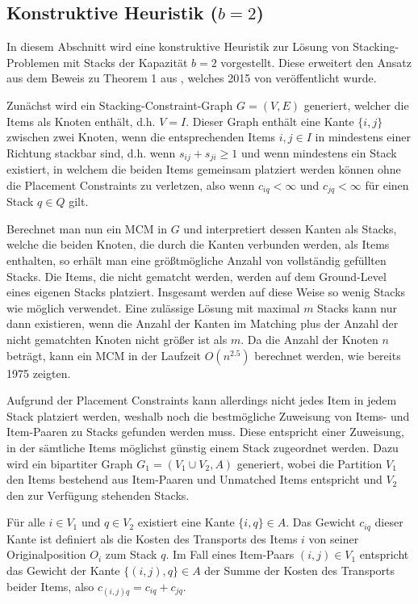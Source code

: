 \subsection{Konstruktive Heuristik ($b = 2$)}
\label{sec:two_cap_heuristic}

In diesem Abschnitt wird eine konstruktive Heuristik zur Lösung von Stacking-Problemen mit Stacks der Kapazität $b=2$
vorgestellt. Diese erweitert den Ansatz aus dem Beweis zu Theorem 1 aus , welches 2015 von \citet{Bruns2015} veröffentlicht wurde.

Zunächst wird ein Stacking-Constraint-Graph $G = (V, E)$ generiert, welcher die Items als Knoten enthält, d.h. $V = I$. Dieser Graph
enthält eine Kante $\{i, j\}$ zwischen zwei Knoten, wenn die entsprechenden Items $i, j \in I$ in mindestens einer Richtung stackbar sind, d.h.
wenn $s_{ij} + s_{ji} \geq 1$ und wenn mindestens ein Stack existiert, in welchem die beiden Items gemeinsam platziert werden können ohne die Placement Constraints zu verletzen, also wenn $c_{iq} < \infty$ und $c_{jq} < \infty$ für einen Stack $q \in Q$ gilt.

Berechnet man nun ein \textsc{MCM} in $G$ und interpretiert dessen Kanten als Stacks, welche die beiden Knoten, die durch
die Kanten verbunden werden, als Items enthalten, so erhält man eine größtmögliche Anzahl von vollständig gefüllten Stacks.
Die Items, die nicht gematcht werden, werden auf dem Ground-Level eines eigenen Stacks platziert.
Insgesamt werden auf diese Weise so wenig Stacks wie möglich verwendet.
Eine zulässige Lösung mit maximal $m$ Stacks kann nur dann existieren, wenn die Anzahl der Kanten im Matching plus der Anzahl der nicht gematchten Knoten nicht größer ist als $m$. Da die Anzahl der Knoten $n$ beträgt, kann ein \textsc{MCM} in der Laufzeit $O(n^{2.5})$ berechnet werden, wie \citet{Even1975} bereits 1975 zeigten.

Aufgrund der Placement Constraints kann allerdings nicht jedes Item in jedem Stack platziert werden, weshalb noch die bestmögliche Zuweisung von
Items- und Item-Paaren zu Stacks gefunden werden muss. Diese entspricht einer Zuweisung, in der sämtliche Items möglichst günstig einem Stack zugeordnet werden. Dazu wird ein bipartiter Graph $G_1 = (V_1 \cup V_2, A)$ generiert, wobei die Partition $V_1$ den Items bestehend aus Item-Paaren und Unmatched Items entspricht und $V_2$ den zur Verfügung stehenden Stacks.

Für alle $i \in V_1$ und $q \in V_2$ existiert eine Kante $\{i, q\} \in A$. Das Gewicht $c_{iq}$ dieser Kante ist definiert als die Kosten
des Transports des Items $i$ von seiner Originalposition $O_i$ zum Stack $q$. Im Fall eines Item-Paars $(i, j) \in V_1$ entspricht das
Gewicht der Kante $\{(i, j), q\} \in A$ der Summe der Kosten des Transports beider Items, also $c_{(i, j)q} = c_{iq} + c_{jq}$.

